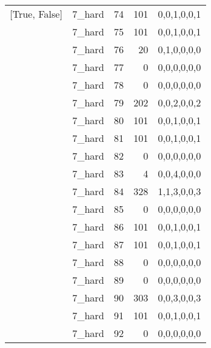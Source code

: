 \begin{tabular}{llrrl}
 [True, False]   & 7\_hard              &            74 &                   101 & 0,0,1,0,0,1   \\
 [True, False]   & 7\_hard              &            75 &                   101 & 0,0,1,0,0,1   \\
 [True, False]   & 7\_hard              &            76 &                    20 & 0,1,0,0,0,0   \\
 [True, False]   & 7\_hard              &            77 &                     0 & 0,0,0,0,0,0   \\
 [True, False]   & 7\_hard              &            78 &                     0 & 0,0,0,0,0,0   \\
 [True, False]   & 7\_hard              &            79 &                   202 & 0,0,2,0,0,2   \\
 [True, False]   & 7\_hard              &            80 &                   101 & 0,0,1,0,0,1   \\
 [True, False]   & 7\_hard              &            81 &                   101 & 0,0,1,0,0,1   \\
 [True, False]   & 7\_hard              &            82 &                     0 & 0,0,0,0,0,0   \\
 [True, False]   & 7\_hard              &            83 &                     4 & 0,0,4,0,0,0   \\
 [True, False]   & 7\_hard              &            84 &                   328 & 1,1,3,0,0,3   \\
 [True, False]   & 7\_hard              &            85 &                     0 & 0,0,0,0,0,0   \\
 [True, False]   & 7\_hard              &            86 &                   101 & 0,0,1,0,0,1   \\
 [True, False]   & 7\_hard              &            87 &                   101 & 0,0,1,0,0,1   \\
 [True, False]   & 7\_hard              &            88 &                     0 & 0,0,0,0,0,0   \\
 [True, False]   & 7\_hard              &            89 &                     0 & 0,0,0,0,0,0   \\
 [True, False]   & 7\_hard              &            90 &                   303 & 0,0,3,0,0,3   \\
 [True, False]   & 7\_hard              &            91 &                   101 & 0,0,1,0,0,1   \\
 [True, False]   & 7\_hard              &            92 &                     0 & 0,0,0,0,0,0   \\

\end{tabular}
